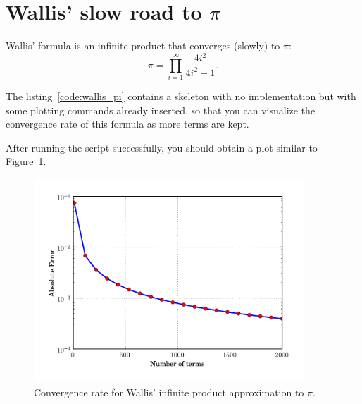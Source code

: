 
\section{Wallis' slow road to $\pi$}

Wallis' formula is an infinite product that converges (slowly) to
$\pi$:\begin{equation}
\pi=\prod_{i=1}^{\infty}\frac{4i^{2}}{4i^{2}-1}.\end{equation}


The listing~\ref{code:wallis_pi} contains a skeleton with no
implementation but with some plotting commands already inserted, so
that you can visualize the convergence rate of this formula as more
terms are kept.



After running the script successfully, you should obtain a plot similar
to Figure~\ref{fig:wallis_pi}.

\begin{center}%
\begin{figure}
\begin{centering}\includegraphics[width=4in]{fig/wallis_pi_convergence}\par\end{centering}


\caption{\label{fig:wallis_pi}Convergence rate for Wallis' infinite product
approximation to $\pi.$}
\end{figure}
\par\end{center}
